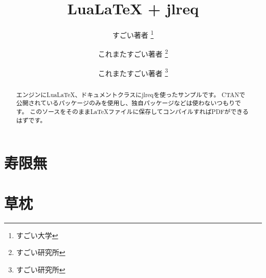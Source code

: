 \documentclass[article, line_length=40zw, head_space=30mm, foot_space=30mm, gutter=30mm]{jlreq}
\title{LuaLaTeX + jlreq}
\author{
    すごい著者 \thanks{すごい大学} \\ \and
    これまたすごい著者 \thanks{すごい研究所} \\ \and
    これまたすごい著者 \thanks{すごい研究所}
}
\begin{document}
\maketitle

\begin{abstract}
エンジンにLuaLaTeX、ドキュメントクラスにjlreqを使ったサンプルです。
CTANで公開されているパッケージのみを使用し、独自パッケージなどは使わないつもりです。
このソースをそのままLaTeXファイルに保存してコンパイルすればPDFができるはずです。
\end{abstract}

\section{寿限無}


\section{草枕}


\newpage
\layout
\end{document}
